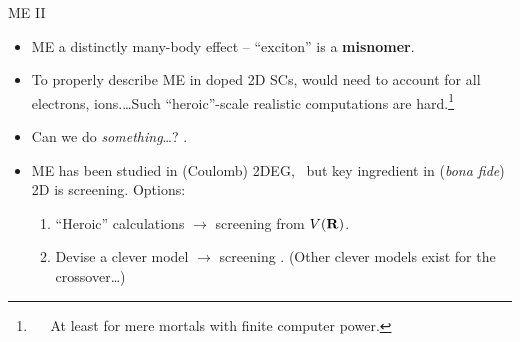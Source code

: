 \documentclass[12pt, pdf, hyperref={draft}, usenames, dvipsnames]{beamer}
\newcommand{\blue}[1]{{\bf\color{NavyBlue}{#1}}}
\newcommand{\green}[1]{{\bf\color{ForestGreen}{#1}}}
\begin{document}
\begin{frame}{ME II}

\begin{itemize}
  \item ME a distinctly many-body effect -- ``exciton'' is a \textbf{misnomer}.

  \item To properly describe ME in doped 2D SCs, would need to account for all
  electrons, ions.\ldots Such ``heroic''-scale realistic computations are
  hard.\footnote{~~ At least for mere mortals with finite computer power.}

  \item Can we do \textit{something}\ldots? \green{I think so}.

  \item ME has been studied in (Coulomb) 2DEG,~ but key
  ingredient in (\textit{bona fide}) 2D is screening. Options:

\begin{enumerate}

  \item ``Heroic'' calculations $\rightarrow$ screening \blue{emergent} from
  $V({\bf R})$.

  \item Devise a clever model $\rightarrow$ screening \blue{modelled}. (Other
  clever models exist for the
  crossover\ldots{})

\end{enumerate}
\end{itemize}

\end{frame}
\end{document}
